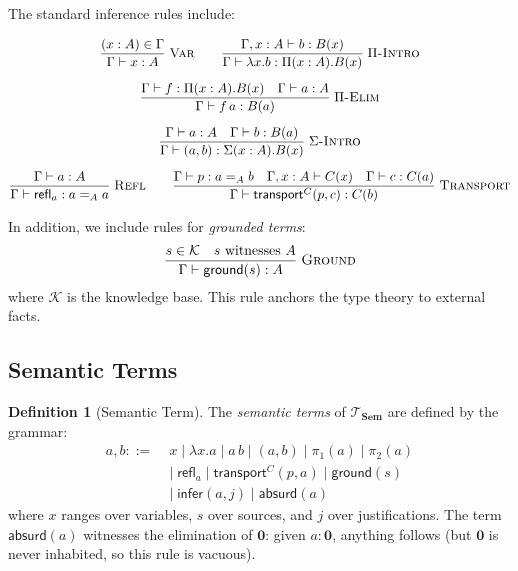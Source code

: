 \documentclass[11pt,a4paper]{article}
\theoremstyle{plain}
\theoremstyle{definition}
\newtheorem{definition}[theorem]{Definition}
\theoremstyle{remark}
\newcommand{\Sem}{\mathbf{Sem}}
\newcommand{\refl}{\mathsf{refl}}
\newcommand{\transport}{\mathsf{transport}}
\begin{document}
The standard inference rules include:

\begin{gather}
  \frac{(x : A) \in \Gamma}{\Gamma \vdash x : A}\;\textsc{Var} \qquad
  \frac{\Gamma, x : A \vdash b : B(x)}{\Gamma \vdash \lambda x.b : \Pi(x:A).B(x)}\;\textsc{$\Pi$-Intro} \label{eq:rules1}\\[6pt]
  \frac{\Gamma \vdash f : \Pi(x:A).B(x) \quad \Gamma \vdash a : A}{\Gamma \vdash f\,a : B(a)}\;\textsc{$\Pi$-Elim} \label{eq:rules2}\\[6pt]
  \frac{\Gamma \vdash a : A \quad \Gamma \vdash b : B(a)}{\Gamma \vdash (a, b) : \Sigma(x:A).B(x)}\;\textsc{$\Sigma$-Intro} \label{eq:rules3}\\[6pt]
  \frac{\Gamma \vdash a : A}{\Gamma \vdash \refl_a : a =_A a}\;\textsc{Refl} \qquad
  \frac{\Gamma \vdash p : a =_A b \quad \Gamma, x : A \vdash C(x) \quad \Gamma \vdash c : C(a)}{\Gamma \vdash \transport^C(p, c) : C(b)}\;\textsc{Transport} \label{eq:rules4}
\end{gather}

In addition, we include rules for \emph{grounded terms}:
\begin{equation}\label{eq:grounding-rule}
  \frac{s \in \mathcal{K} \quad s \text{ witnesses } A}{\Gamma \vdash \mathsf{ground}(s) : A}\;\textsc{Ground}
\end{equation}
where $\mathcal{K}$ is the knowledge base.
This rule anchors the type theory to external facts.

\subsection{Semantic Terms}

\begin{definition}[Semantic Term]\label{def:semterm}
The \emph{semantic terms} of $\mathcal{T}_{\Sem}$ are defined by the grammar:
\begin{align*}
  a, b ::=\;& x \mid \lambda x.a \mid a\,b \mid (a, b) \mid \pi_1(a) \mid \pi_2(a) \\
  &\mid\; \refl_a \mid \transport^C(p, a) \mid \mathsf{ground}(s) \\
  &\mid\; \mathsf{infer}(a, j) \mid \mathsf{absurd}(a)
\end{align*}
where $x$ ranges over variables, $s$ over sources, and $j$ over justifications.
The term $\mathsf{absurd}(a)$ witnesses the elimination of $\mathbf{0}$: given $a : \mathbf{0}$, anything follows (but $\mathbf{0}$ is never inhabited, so this rule is vacuous).
\end{definition}
\end{document}
